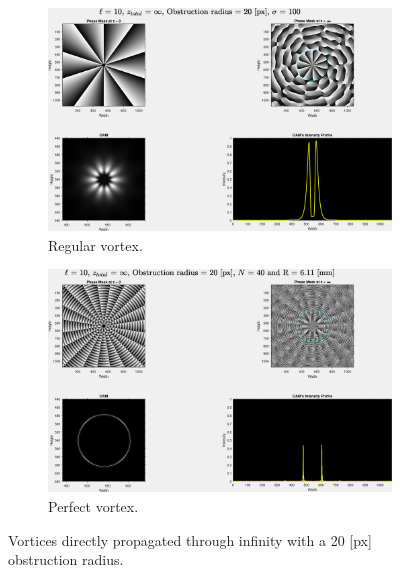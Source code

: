 \begin{figure}[htbp]
    \centering
    \begin{subfigure}[b]{0.45\textwidth}
        \centering
        \includegraphics[width=\textwidth]{images/c04/type=0_r=20_zi=0_zf=Inf.eps}
        \caption{Regular vortex.}
    \end{subfigure}
    \hfill
    \begin{subfigure}[b]{0.45\textwidth}
        \centering
        \includegraphics[width=\textwidth]{images/c04/type=1_r=20_zi=0_zf=Inf.eps}
        \caption{Perfect vortex.}
    \end{subfigure}
    \caption{Vortices directly propagated through infinity with a 20 [px] obstruction radius.}
    \label{fig:Vortices_r=20_z=inf}
\end{figure}

